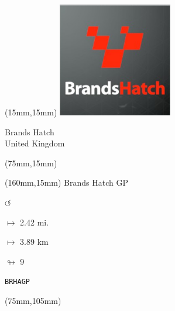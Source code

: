 \begin{textblock*}{50mm}(15mm,15mm)%
\includegraphics[width=50mm]{LG/2015-05-20_00074.png}
\par Brands Hatch\\ United Kingdom
\end{textblock*}
\begin{textblock*}{80mm}(75mm,15mm)%
\end{textblock*}
\begin{textblock*}{40mm}(160mm,15mm)%
Brands Hatch GP
\par \Huge$\circlearrowleft$
\Large
\par$\mapsto$ 2.42 mi.
\par$\mapsto$ 3.89 km
\par$\looparrowright$ 9
\par\hfill\tiny\tt BRHAGP\\
\end{textblock*}
\begin{textblock*}{80mm}(75mm,105mm)%
\end{textblock*}
